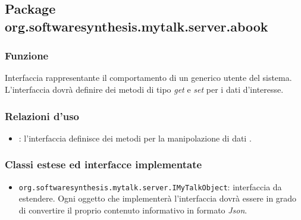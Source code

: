 \subsection{Package org.softwaresynthesis.mytalk.server.abook}\label{sec:abook}


\subsubsection*{Funzione}
Interfaccia rappresentante il comportamento di un generico utente del sistema. L'interfaccia dovrà definire dei metodi di tipo \textit{get} e \textit{set} per i dati d'interesse.

\subsubsection*{Relazioni d'uso}

\begin{itemize}
	\item {}: l'interfaccia definisce dei metodi per la manipolazione di dati .
\end{itemize}

\subsubsection*{Classi estese ed interfacce implementate}
\begin{itemize}
	\item \texttt{org.softwaresynthesis.mytalk.server.IMyTalkObject}: interfaccia da estendere. Ogni oggetto che implementerà l'interfaccia  dovrà essere in grado di convertire il proprio contenuto informativo in formato \textit{Json}.
\end{itemize}


